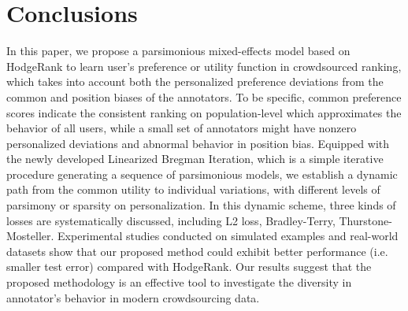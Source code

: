 \documentclass[10pt,journal,cspaper,compsoc]{IEEEtran}
\begin{document}
{{\begin{table}[h]
\begin{lrbox}{\tablebox}
\begin{tabular}{||c|c|c|c||c|c|c|c||}
 \hline
\end {tabular}
\medskip
\end{lrbox}
\scalebox{1}{\usebox{\tablebox}}
\end{table}
\par}










\section{Conclusions}\label{sec:conclusion}

In this paper, we propose a parsimonious mixed-effects model based on HodgeRank to learn user's preference or utility function in crowdsourced ranking, which
takes into account both the personalized preference deviations from the common and position biases of the annotators.
To be specific, common preference scores indicate the consistent ranking on population-level which approximates the behavior of
all users, while a small set of annotators might have nonzero
personalized deviations and abnormal behavior in position bias. Equipped with the newly developed Linearized
Bregman Iteration, which is a simple iterative procedure generating a sequence of parsimonious models,  we establish a dynamic path from the common utility to individual
variations, with different levels of parsimony or sparsity on personalization. In this dynamic scheme, three kinds of losses are systematically discussed, including  L2 loss, Bradley-Terry, Thurstone-Mosteller.
Experimental studies conducted on simulated examples and real-world
datasets show that our proposed method could exhibit better performance (i.e.
smaller test error) compared with HodgeRank.
Our results suggest that the proposed methodology is an effective tool to investigate the diversity in annotator's behavior
in modern crowdsourcing data.

\ifCLASSOPTIONcaptionsoff
  \newpage
\fi



 

}
\end{document}
